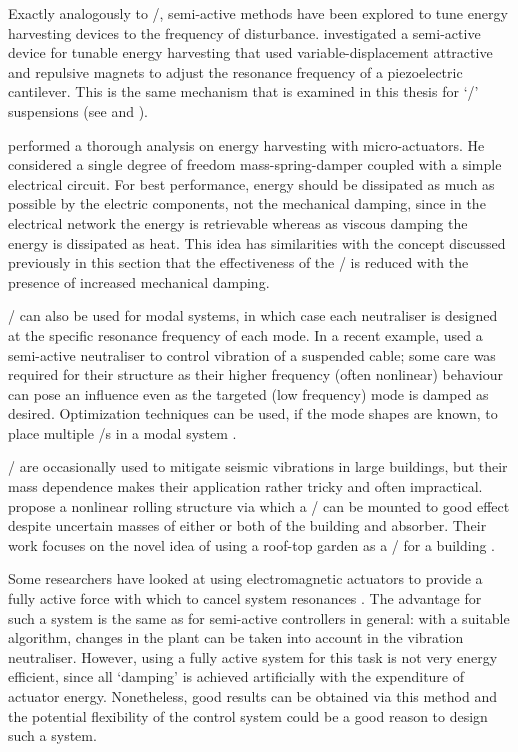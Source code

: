 Exactly analogously to \vibneut/, semi-active methods have been explored to tune energy harvesting devices to the frequency of disturbance.
\textcite{challa2008} investigated a semi-active device for tunable energy harvesting that used variable-displacement attractive and repulsive magnets to adjust the resonance frequency of a piezoelectric cantilever.
This is the same mechanism that is examined in this thesis for `\qzs/' suspensions (see  and ).

\textcite{stephen2006} performed a thorough analysis on energy harvesting with micro-actuators.
He considered a single degree of freedom mass-spring-damper coupled with a simple electrical circuit.
For best performance, energy should be dissipated as much as possible by the electric components, not the mechanical damping, since in the electrical network the energy is retrievable whereas as viscous damping the energy is dissipated as heat.
This idea has similarities with the concept discussed previously in this section that the effectiveness of the \vibneut/ is reduced with the presence of increased mechanical damping.

\Vibneut/ can also be used for modal systems, in which case each neutraliser is designed at the specific resonance frequency of each mode.
In a recent example, \textcite{casciati2007} used a semi-active neutraliser to control vibration of a suspended cable; some care was required for their structure as their higher frequency (often nonlinear) behaviour can pose an influence even as the targeted (low frequency) mode is damped as desired.
Optimization techniques can be used, if the mode shapes are known, to place multiple \vibneut/s in a modal system \cite{petit2009}.

\Vibneut/ are occasionally used to mitigate seismic vibrations in large buildings, but their mass dependence makes their application rather tricky and often impractical.
\textcite{matta2008} propose a nonlinear rolling structure via which a \vibneut/ can be mounted to good effect despite uncertain masses of either or both of the building and absorber.
Their work focuses on the novel idea of using a roof-top garden as a \vibneut/ for a building \cite{matta2008a}.

Some researchers have looked at using electromagnetic actuators to provide a fully active force with which to cancel system resonances \cite{chen2005a,wu2007,kim2008a}.
The advantage for such a system is the same as for semi-active controllers in general: with a suitable algorithm, changes in the plant can be taken into account in the vibration neutraliser.
However, using a fully active system for this task is not very energy efficient, since all `damping' is achieved artificially with the expenditure of actuator energy.
Nonetheless, good results can be obtained via this method and the potential flexibility of the control system could be a good reason to design such a system.



